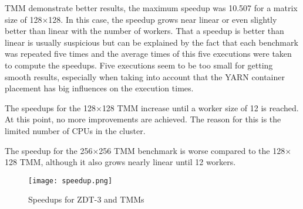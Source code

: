 TMM demonstrate better results, the maximum speedup was 10.507 for a matrix size of 128$\times$128. In this case, the speedup grows near linear or even slightly better than linear with the number of workers. That a speedup is better than linear is usually suspicious but can be explained by the fact that each benchmark was repeated five times and the average times of this five executions were taken to compute the speedups. Five executions seem to be too small for getting smooth results, especially when taking into account that the YARN container placement has big influences on the execution times.

The speedups for the 128$\times$128 TMM increase until a worker size of 12 is reached. At this point, no more improvements are achieved. The reason for this is the limited number of CPUs in the cluster.

The speedup for the 256$\times$256 TMM benchmark is worse compared to the 128$\times$128 TMM, although it also grows nearly linear until 12 workers.

\begin{figure}
  \centering
  \texttt{[image: speedup.png]}
  \caption[Speedups for ZDT-3 and TMMs]{Speedups for ZDT-3 and TMMs}
  \label{fig:speedup}
\end{figure}

% 
% 
% 


